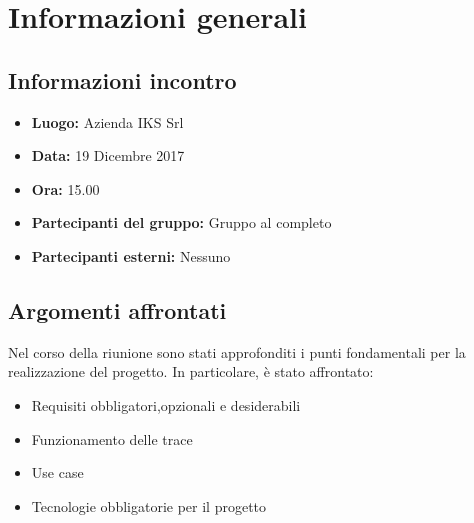 \documentclass[a4paper, oneside, openany]{article}
\begin{document}
\restoregeometry
	
	\section{Informazioni generali}
		\subsection{Informazioni incontro}
			\begin{itemize}
				\item { \textbf{Luogo:} Azienda IKS Srl  }
				\item { \textbf{Data:} 19 Dicembre 2017 }
				\item { \textbf{Ora:} 15.00 }
				\item { \textbf{Partecipanti del gruppo:} Gruppo al completo }
				\item { \textbf{Partecipanti esterni:} Nessuno }
			\end{itemize}
		
	
	\subsection{Argomenti affrontati}
    Nel corso della riunione sono stati approfonditi i punti fondamentali per la realizzazione del progetto.
    In particolare, è stato affrontato:

    \begin{itemize}
	\item { Requisiti obbligatori,opzionali e desiderabili }
	\item { Funzionamento delle trace }
	\item { Use case }
	\item { Tecnologie obbligatorie per il progetto}
     \end{itemize}
 
\end{document}
